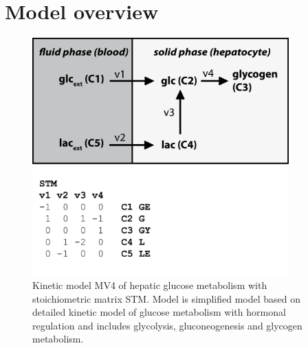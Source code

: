 \section{Model overview}
\label{sec: model}
 
\begin{figure}[htp]
 \centering
 \includegraphics[width=280pt,keepaspectratio=true]{./figures/mv4_overview.png}
\caption{Kinetic model MV4 of hepatic glucose metabolism with stoichiometric matrix STM.  Model is simplified model based on detailed kinetic model of glucose metabolism with hormonal regulation and includes glycolysis, gluconeogenesis and glycogen metabolism.}
\label{fig: overview}
\end{figure}

